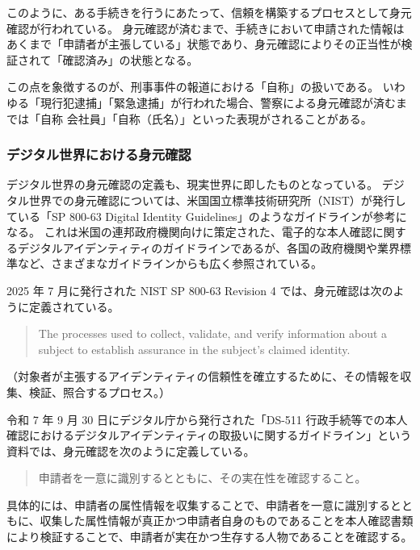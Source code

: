 \documentclass[uplatex]{jsarticle}
\def\label#1{}%
\begin{document}
このように、ある手続きを行うにあたって、信頼を構築するプロセスとして身元確認が行われている。
身元確認が済むまで、手続きにおいて申請された情報はあくまで「申請者が主張している」状態であり、身元確認によりその正当性が検証されて「確認済み」の状態となる。

\begin{exa}[報道における「自称」]\label{exa:ch2-self-proclaimed}
この点を象徴するのが、刑事事件の報道における「自称」の扱いである。
いわゆる「現行犯逮捕」「緊急逮捕」が行われた場合、警察による身元確認が済むまでは「自称 会社員」「自称（氏名）」といった表現がされることがある。
\end{exa}

\subsubsection{デジタル世界における身元確認}

デジタル世界の身元確認の定義も、現実世界に即したものとなっている。
デジタル世界での身元確認については、米国国立標準技術研究所（NIST）が発行している「SP 800-63 Digital Identity Guidelines」のようなガイドラインが参考になる。
これは米国の連邦政府機関向けに策定された、電子的な本人確認に関するデジタルアイデンティティのガイドラインであるが、各国の政府機関や業界標準など、さまざまなガイドラインからも広く参照されている。

\begin{rem}\label{rem:ch2-nist-proofing}
2025 年 7 月に発行された NIST SP 800-63 Revision 4 では、身元確認は次のように定義されている。
\begin{quote}
The processes used to collect, validate, and verify information about a subject to establish assurance in the subject's claimed identity.
\end{quote}
（対象者が主張するアイデンティティの信頼性を確立するために、その情報を収集、検証、照合するプロセス。）
\end{rem}

\begin{rem}\label{rem:ch2-ds511-proofing}
令和 7 年 9 月 30 日にデジタル庁から発行された「DS-511 行政手続等での本人確認におけるデジタルアイデンティティの取扱いに関するガイドライン」という資料では、身元確認を次のように定義している。
\begin{quote}
申請者を一意に識別するとともに、その実在性を確認すること。
\end{quote}
具体的には、申請者の属性情報を収集することで、申請者を一意に識別するとともに、収集した属性情報が真正かつ申請者自身のものであることを本人確認書類により検証することで、申請者が実在かつ生存する人物であることを確認する。
\end{rem}
\end{document}
